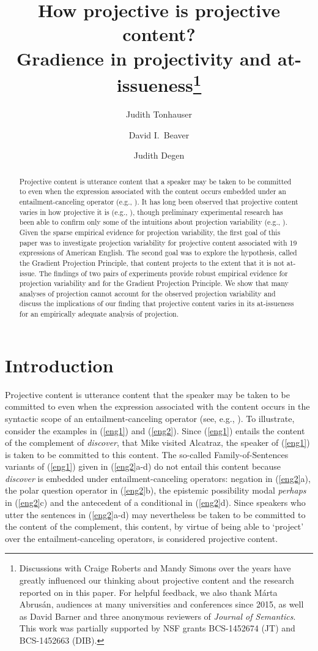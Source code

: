 \documentclass[11pt,fleqn]{article}
\title{How projective is projective content? \\ Gradience in projectivity and at-issueness\thanks{Discussions with Craige Roberts and Mandy Simons over the years have greatly influenced our thinking about projective content and the research reported on in this paper. For helpful feedback, we also thank M\'arta Abrus\'an, audiences at many universities and conferences since 2015, as well as David Barner and three anonymous reviewers of {\em Journal of Semantics}. This work was partially supported by NSF grants BCS-1452674 (JT) and BCS-1452663 (DIB).}}
\author[$\bullet$]{Judith Tonhauser}
\author[$\circ$]{David I.\ Beaver}
\author[$\triangleright$]{Judith Degen}
\affil[$\bullet$]{The Ohio State University}
\affil[$\circ$]{University of Texas at Austin}
\affil[$\triangleright$]{Stanford University}
\newcommand{\6}{\mbox{$[\hspace*{-.6mm}[$}}
\newcommand{\9}{\mbox{$]\hspace*{-.6mm}]$}}
\begin{document}
\maketitle

\begin{abstract}
Projective content is utterance content that a speaker may be taken to be committed to even when the expression associated with the content occurs embedded under an entailment-canceling operator (e.g., \citealt{ccmg90}). It has long been observed that projective content varies in how projective it is (e.g., \citealt{karttunen71b,simons01,abusch10}), though preliminary experimental research has been able to confirm only some of the intuitions about projection variability (e.g., \citealt{smith-hall11,xue-onea11}). Given the sparse empirical evidence for projection variability, the first goal of this paper was to investigate projection variability for projective content associated with 19 expressions of American English. The second goal was to explore the hypothesis, called the Gradient Projection Principle, that content projects to the extent that it is not at-issue. The findings of two pairs of experiments provide robust empirical evidence for projection variability and for the Gradient Projection Principle. We show that many analyses of projection  cannot account for the observed projection variability and discuss the implications of our finding that projective content varies in its at-issueness for an empirically adequate analysis of projection.

\end{abstract}


			
\section{Introduction}\label{s1}

Projective content is utterance content that the speaker may be taken to be committed to even when the expression associated with the content occurs in the syntactic scope of an entailment-canceling operator (see, e.g., \citealt{ccmg90}). To illustrate, consider the examples in (\ref{eng1}) and (\ref{eng2}). Since (\ref{eng1}) entails the content of the complement of {\em discover}, that Mike visited Alcatraz, the speaker of (\ref{eng1}) is taken to be committed to this content. The so-called Family-of-Sentences variants of (\ref{eng1}) given in (\ref{eng2}a-d) do not entail this content because {\em discover} is embedded under entailment-canceling operators: negation in (\ref{eng2}a), the polar question operator in (\ref{eng2}b), the epistemic possibility modal {\em perhaps} in (\ref{eng2}c) and the antecedent of a conditional in (\ref{eng2}d). Since speakers who utter the sentences in (\ref{eng2}a-d) may nevertheless be taken to be committed to the content of the complement, this content, by virtue of being able to `project' over the entailment-canceling operators, is considered projective content. 
\end{document}

